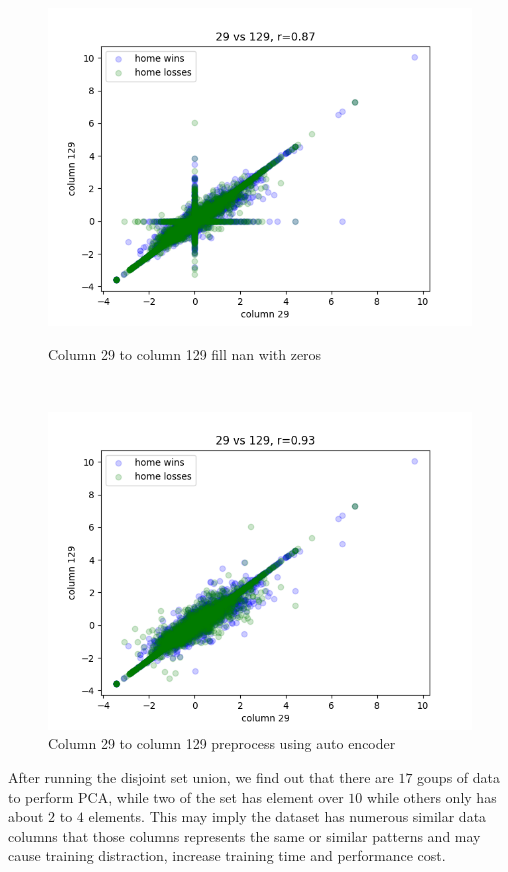 \documentclass[12pt,a4paper]{article}
\begin{document}
\begin{figure}[h]
    \begin{minipage}{.4\textwidth}
        \centering
        \includegraphics[width=0.8\linewidth]{0.87r_29_to_129.png}
        \caption[width=0.8\linewidth]{Column 29 to column 129 fill nan with zeros}
        \label{fig:29-129}
    \end{minipage}%
    \begin{minipage}{.1\textwidth}
        \ 
    \end{minipage}%
    \begin{minipage}{.4\textwidth}
        \centering
        \includegraphics[width=0.8\linewidth]{0.93r_29_to_129_recovered.png}
        \caption[width=0.8\linewidth]{Column 29 to column 129 preprocess using auto encoder}
        \label{fig:29-129r}
    \end{minipage}
\end{figure}

After running the disjoint set union, we find out that there are $17$ goups of data to perform PCA, while two of the set has element over $10$ while others only has about $2$ to $4$ elements.
This may imply the dataset has numerous similar data columns that those columns represents the same or similar patterns and may cause training distraction, increase training time and performance cost.
\end{document}
